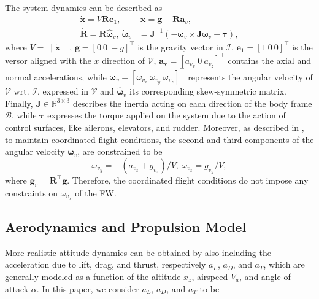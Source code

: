 The system dynamics can be described as
\begin{equation}
    \begin{split}
    \mathbf{\dot{x}} = V\mathbf{R}\mathbf{e}_1,&~\mathbf{\ddot{x}} = \mathbf{g} + \mathbf{R}\mathbf{a}_v,\\
    \mathbf{\dot{R}} = \mathbf{R}\hat{\bm\omega}_v,~\dot{\bm{\omega}}_v &= \mathbf{J}^{-1}(-\bm{\omega}_v \times \mathbf{J}\bm{\omega}_v + \bm{\tau}),\label{eq:system_dynamics4}
\end{split}
\end{equation}
where $V = \lVert \dot{\mathbf{x}} \rVert$, $\mathbf{g} = [0~0~-g]^{\top}$ is the gravity vector in $\mathcal{I}$, $\mathbf{e}_1 = [1~0~0]^{\top}$ is the versor aligned with the $x$ direction of $\mathcal{V}$, $\mathbf{a_v} = [a_{v_x}~0~a_{v_z}]^\top$ contains the axial and normal accelerations, while $\boldsymbol{\omega}_v = [\omega_{v_x}~\omega_{v_y}~ \omega_{v_z}]^\top$ represents the angular velocity of $\mathcal{V}$ wrt. $\mathcal{I}$, expressed in $\mathcal{V}$ and $\hat{\bm\omega}_v$ its corresponding skew-symmetric matrix. Finally, $\mathbf{J} \in \mathbb{R}^{3 \times 3}$ describes the inertia acting on each direction of the body frame $\mathcal{B}$, while $\bm{\tau}$ expresses the torque applied on the system due to the action of control surfaces, like ailerons, elevators, and rudder. 
Moreover, as described in \cite{hauser1997aggressive}, to maintain coordinated flight conditions, the second and third components of the angular velocity $\boldsymbol{\omega}_v$, are constrained to be 
\begin{equation}
    \omega_{v_y} = -(a_{v_z} + g_{v_z})/V,~\omega_{v_z} = g_{v_y}/V,\label{eq:system_dynamics5}
\end{equation}
where $\mathbf{g}_{v} = \mathbf{R}^{\top} \mathbf{g}$.
Therefore, the coordinated flight conditions do not impose any constraints on $\omega_{v_x}$ of the FW. 

\subsection{Aerodynamics and Propulsion Model}
\label{sec:Aerodynamics_and_prop}

More realistic attitude dynamics can be obtained by also including the acceleration due to lift, drag, and thrust, respectively $a_L$, $a_D$, and $a_T$, which are generally modeled as a function of the altitude $x_z$, airspeed $V_a$, and angle of attack $\alpha$. In this paper, we consider $a_L$, $a_D$, and $a_T$  to be~\cite{tseng1988calculation}

